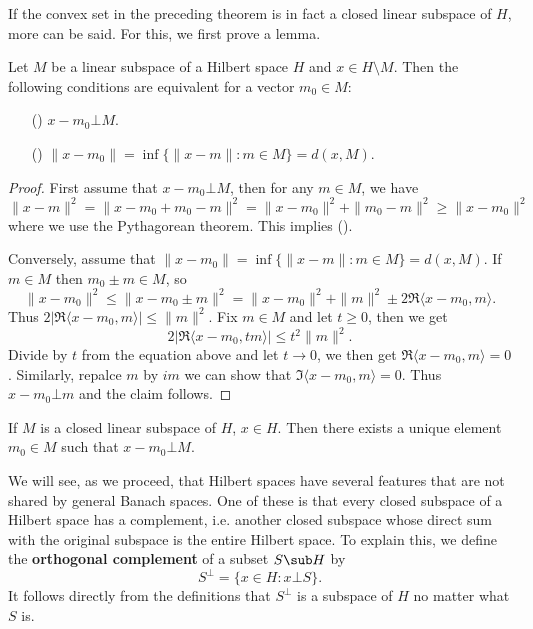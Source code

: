 If the convex set in the preceding theorem is in fact a closed linear subspace of $H$, more can be said. For this, we first prove a lemma.
\begin{lemma}\label{Hilbert space nearest iff}
Let $M$ be a linear subspace of a Hilbert space $H$ and $x\in H\setminus M$. Then the following conditions are equivalent for a vector $m_0\in M$:
\begin{itemize}
\item[(\rmnum{1})] $x-m_0\bot M$.
\item[(\rmnum{2})] $\|x-m_0\|=\inf\{\|x-m\|:m\in M\}=d(x,M)$.
\end{itemize}
\end{lemma}
\begin{proof}
First assume that $x-m_0\bot M$, then for any $m\in M$, we have
\[\|x-m\|^2=\|x-m_0+m_0-m\|^2=\|x-m_0\|^2+\|m_0-m\|^2\geq\|x-m_0\|^2\]
where we use the Pythagorean theorem. This implies ().\par
Conversely, assume that $\|x-m_0\|=\inf\{\|x-m\|:m\in M\}=d(x,M)$. If $m\in M$ then $m_0\pm m\in M$, so
\[\|x-m_0\|^2\leq\|x-m_0\pm m\|^2=\|x-m_0\|^2+\|m\|^2\pm 2\Re\langle x-m_0,m\rangle.\]
Thus $2|\Re\langle x-m_0,m\rangle|\leq\|m\|^2$. Fix $m\in M$ and let $t\geq 0$, then we get
\[2|\Re\langle x-m_0,tm\rangle|\leq t^2\|m\|^2.\]
Divide by $t$ from the equation above and let $t\to 0$, we then get $\Re\langle x-m_0,m\rangle=0$. Similarly, repalce $m$ by $im$ we can show that $\Im\langle x-m_0,m\rangle=0$. Thus $x-m_0\bot m$ and the claim follows.
\end{proof}
\begin{corollary}\label{Hilbert space closed subspace orthogonal}
If $M$ is a closed linear subspace of $H$, $x\in H$. Then there exists a unique element $m_0\in M$ such that $x-m_0\bot M$.
\end{corollary}
We will see, as we proceed, that Hilbert spaces have several features that are not shared by general Banach spaces. One of these is that every closed subspace of a Hilbert space has a complement, i.e. another closed subspace whose direct sum with the original subspace is the entire Hilbert space. To explain this, we define the \textbf{orthogonal complement} of a subset $S\sub H$ by
\[S^\bot=\{x\in H:x\bot S\}.\]
It follows directly from the definitions that $S^\bot$ is a subspace of $H$ no matter what $S$ is.
